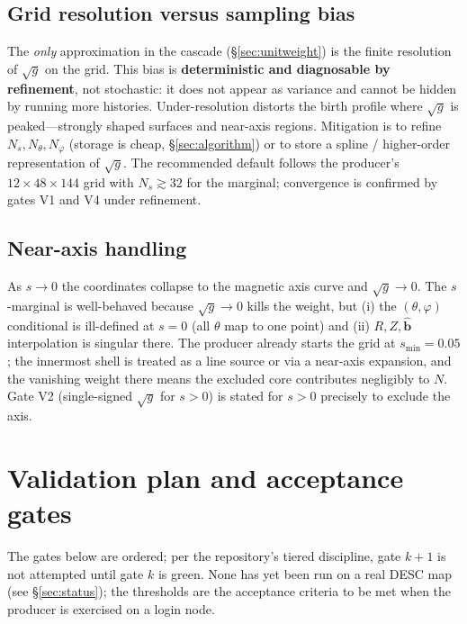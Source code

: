 \documentclass[11pt]{article}
\newcommand{\sg}{\sqrt{g}}
\newcommand{\bhat}{\hat{\mathbf{b}}}
\begin{document}
\subsection{Grid resolution versus sampling bias}

The \emph{only} approximation in the cascade (\S\ref{sec:unitweight}) is the finite
resolution of $\sg$ on the grid. This bias is \textbf{deterministic and diagnosable by
refinement}, not stochastic: it does not appear as variance and cannot be hidden by
running more histories. Under-resolution distorts the birth profile where $\sg$ is
peaked---strongly shaped surfaces and near-axis regions. Mitigation is to refine
$N_s,N_\theta,N_\varphi$ (storage is cheap, \S\ref{sec:algorithm}) or to store a
spline / higher-order representation of $\sg$. The recommended default follows the
producer's $12\times48\times144$ grid with $N_s\gtrsim32$ for the marginal;
convergence is confirmed by gates V1 and V4 under refinement.

\subsection{Near-axis handling}

As $s\to0$ the coordinates collapse to the magnetic axis curve and $\sg\to0$. The
$s$-marginal is well-behaved because $\sg\to0$ kills the weight, but (i) the
$(\theta,\varphi)$ conditional is ill-defined at $s=0$ (all $\theta$ map to one point)
and (ii) $R,Z,\bhat$ interpolation is singular there. The producer already starts the
grid at $s_{\min}=0.05$; the innermost shell is treated as a line source or via a
near-axis expansion, and the vanishing weight there means the excluded core
contributes negligibly to $N$. Gate V2 (single-signed $\sg$ for $s>0$) is stated for
$s>0$ precisely to exclude the axis.

\section{Validation plan and acceptance gates}
\label{sec:validation}

The gates below are ordered; per the repository's tiered discipline, gate $k{+}1$ is
not attempted until gate $k$ is green. None has yet been run on a real DESC map (see
\S\ref{sec:status}); the thresholds are the acceptance criteria to be met when the
producer is exercised on a login node.
\end{document}
